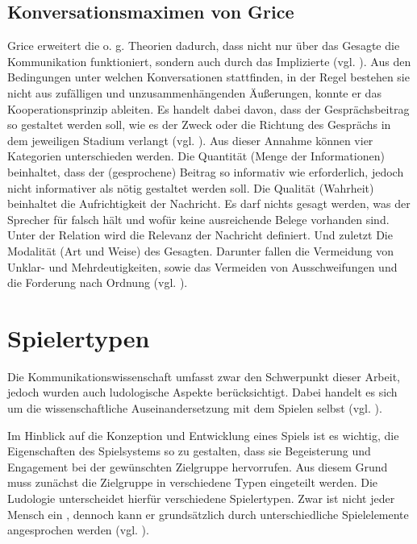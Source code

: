 \subsection{Konversationsmaximen von Grice}
Grice erweitert die o. g. Theorien dadurch, dass nicht nur über das Gesagte die Kommunikation funktioniert, sondern auch durch das Implizierte (vgl. \cite[S. 43f]{grice1975logic}). Aus den Bedingungen unter welchen Konversationen stattfinden, in der Regel bestehen sie nicht aus zufälligen und unzusammenhängenden Äußerungen, konnte er das Kooperationsprinzip ableiten. Es handelt dabei davon, dass der Gesprächsbeitrag so gestaltet werden soll, wie es der Zweck oder die Richtung des Gesprächs in dem jeweiligen Stadium verlangt (vgl. \cite[S. 45]{grice1975logic}).
Aus dieser Annahme können vier Kategorien unterschieden werden. Die Quantität (Menge der Informationen) beinhaltet, dass der (gesprochene) Beitrag so informativ wie erforderlich, jedoch nicht informativer als nötig gestaltet werden soll. Die Qualität (Wahrheit) beinhaltet die Aufrichtigkeit der Nachricht. Es darf nichts gesagt werden, was der Sprecher für falsch hält und wofür keine ausreichende Belege vorhanden sind. Unter der Relation wird die Relevanz der Nachricht definiert. Und zuletzt Die Modalität (Art und Weise) des Gesagten. Darunter fallen die Vermeidung von Unklar- und Mehrdeutigkeiten, sowie das Vermeiden von Ausschweifungen und die Forderung nach Ordnung (vgl. \cite[S. 45f]{grice1975logic}).
 
\section{Spielertypen}
Die Kommunikationswissenschaft umfasst zwar den Schwerpunkt dieser Arbeit, jedoch wurden auch ludologische Aspekte berücksichtigt. Dabei handelt es sich um die wissenschaftliche Auseinandersetzung mit dem Spielen selbst (vgl. \cite{ludologie_spielforschung_nodate}). 

Im Hinblick auf die Konzeption und Entwicklung eines Spiels ist es wichtig, die Eigenschaften des Spielsystems so zu gestalten, dass sie Begeisterung und Engagement bei der gewünschten Zielgruppe hervorrufen. Aus diesem Grund muss zunächst die Zielgruppe in verschiedene Typen eingeteilt werden. Die Ludologie unterscheidet hierfür verschiedene Spielertypen. Zwar ist nicht jeder Mensch ein , dennoch kann er grundsätzlich durch unterschiedliche Spielelemente angesprochen werden (vgl. \cite{ludologie_spielertypen_nodate}).

